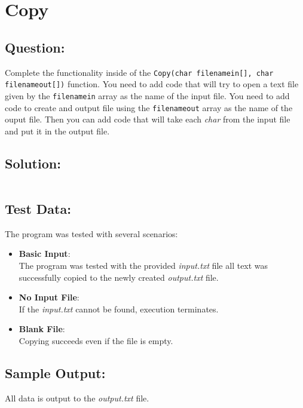 \documentclass[Lab-C.tex]{subfiles}
\begin{document}
    \section{Copy}
        \subsection*{Question:}
        Complete the functionality inside of the \texttt{Copy(char filenamein[], char filenameout[])} function. 
        You need to add code that will try to open a text file given by the \texttt{filenamein} array as the name of the input file. 
        You need to add code to create and output file using the \texttt{filenameout} array as the name of the ouput file. 
        Then you can add code that will take each \textit{char} from the input file and put it in the output file.
            
        \subsection*{Solution:}
            \inputminted{cpp}{../Tasks/02-Copy/Copy.cpp}%

        \subsection*{Test Data:}
            The program was tested with several scenarios:
            \begin{itemize}
                \item \textbf{Basic Input}:\\
                    The program was tested with the provided \textit{input.txt} file
                    all text was successfully copied to the newly created \textit{output.txt} file.
                
                \item \textbf{No Input File}:\\
                    If the \textit{input.txt} cannot be found, execution terminates.
                    
                \item \textbf{Blank File}:\\
                    Copying succeeds even if the file is empty.
            \end{itemize}
        
        \subsection*{Sample Output:}
            All data is output to the \textit{output.txt} file.
\end{document}
